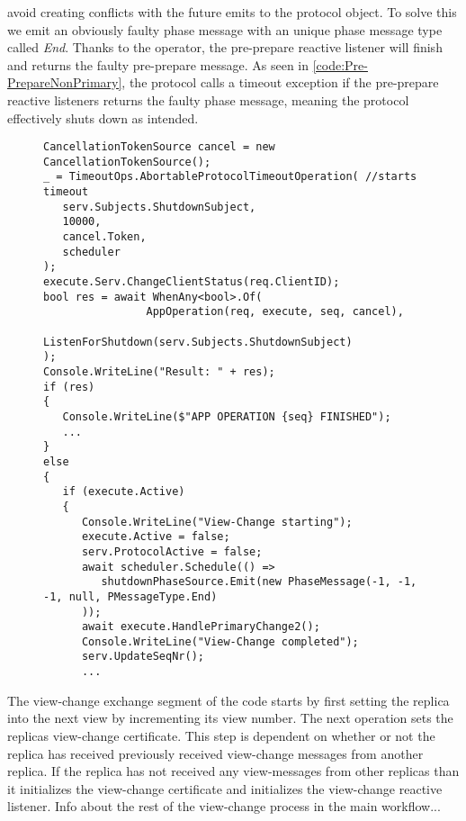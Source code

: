 avoid creating conflicts with the future emits to the protocol  object. To solve this we emit an obviously faulty phase message with an unique phase message type called \emph{End}. Thanks to the  operator, the pre-prepare reactive listener will finish and returns the faulty pre-prepare message. As seen in \autoref{code:Pre-PrepareNonPrimary}, the protocol calls a timeout exception if the pre-prepare reactive listeners returns the faulty phase message, meaning the protocol effectively shuts down as intended.   

\begin{figure}[H]
	\centering
	\begin{lstlisting}[label = code:timeout, caption=Handling timeout for the normal protocol workflow and initiate View-Change, captionpos = b, basicstyle=\scriptsize]
CancellationTokenSource cancel = new CancellationTokenSource();
_ = TimeoutOps.AbortableProtocolTimeoutOperation( //starts timeout
   serv.Subjects.ShutdownSubject,
   10000,
   cancel.Token,
   scheduler
);
execute.Serv.ChangeClientStatus(req.ClientID);
bool res = await WhenAny<bool>.Of(
                AppOperation(req, execute, seq, cancel),
                ListenForShutdown(serv.Subjects.ShutdownSubject)
);
Console.WriteLine("Result: " + res);
if (res)
{
   Console.WriteLine($"APP OPERATION {seq} FINISHED");
   ...
}
else
{
   if (execute.Active)
   {
      Console.WriteLine("View-Change starting");
      execute.Active = false;
      serv.ProtocolActive = false;
      await scheduler.Schedule(() =>
         shutdownPhaseSource.Emit(new PhaseMessage(-1, -1, -1, null, PMessageType.End)
      ));
      await execute.HandlePrimaryChange2(); 
      Console.WriteLine("View-Change completed");
      serv.UpdateSeqNr();
      ...
    \end{lstlisting}
\end{figure} 
 
The view-change exchange segment of the code starts by first setting the replica into the next view by incrementing its view number. The next operation sets the replicas view-change certificate. This step is dependent on whether or not the replica has received previously received view-change messages from another replica. If the replica has not received any view-messages from other replicas than it initializes the view-change certificate and initializes the view-change reactive listener. Info about the rest of the view-change process in the main workflow...

